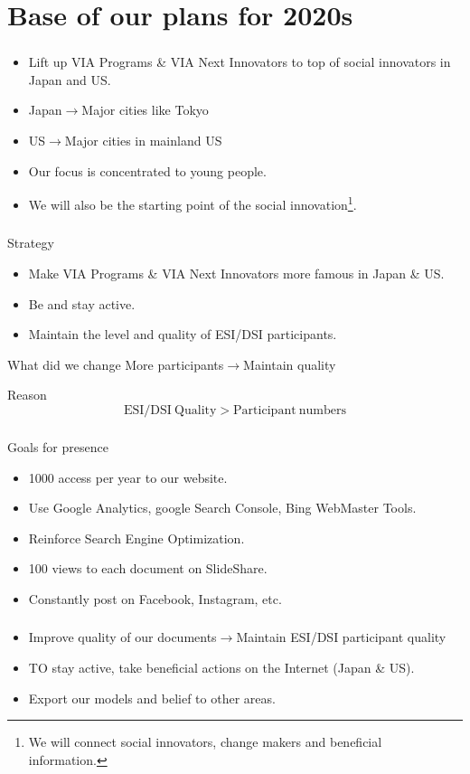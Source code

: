 \documentclass[dvipdfmx,10pt]{beamer}
\newcommand{\bb}{\begin{block}}
\newcommand{\eb}{\end{block}}
\newcommand{\ft}{\frametitle}
\begin{document}
\section{Base of our plans for 2020s}
\begin{frame}\ft{\insertsection}
\begin{itemize}
\item Lift up VIA Programs \& VIA Next Innovators to top of social innovators in Japan and US.
\item Japan$\to$Major cities like Tokyo
\item US$\to$Major cities in mainland US 
\item Our focus is concentrated to young people.
\item We will also be the starting point of the social innovation\footnote{We will connect social innovators, change makers and beneficial information.}.
\end{itemize}
\end{frame}
\begin{frame}\ft{\insertsection}
\bb{Strategy}
\begin{itemize}
\item Make VIA Programs \& VIA Next Innovators more famous in Japan \& US.
\item Be and stay active.
\item Maintain the level and quality of ESI/DSI participants.
\end{itemize}
\eb
\begin{alertblock}{What did we change}
More participants$\to$Maintain quality
\end{alertblock}
\bb{Reason}
$$\mathrm{ESI/DSI \ Quality}>\mathrm{Participant \ numbers}$$
\eb
\end{frame}
\begin{frame}\ft{\insertsection}
\bb{Goals for presence}
\begin{itemize}
\item 1000 access per year to our website.
\item Use Google Analytics, google Search Console, Bing WebMaster Tools.
\item Reinforce Search Engine Optimization.
\item 100 views to each document on SlideShare.
\item Constantly post on Facebook, Instagram, etc.
\end{itemize}
\eb
\end{frame}
\begin{frame}\ft{\insertsection}
\begin{itemize}
\item Improve quality of our documents$\to$Maintain ESI/DSI participant quality
\item TO stay active, take beneficial actions on the Internet (Japan \& US).
\item Export our models and belief to other areas.
\end{itemize}
\end{frame}
\end{document}

